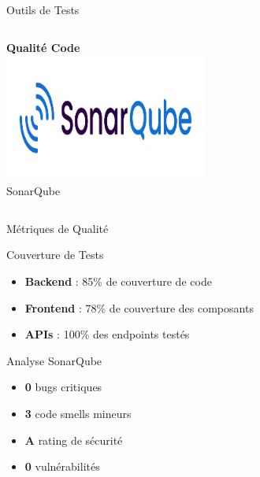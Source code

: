 \documentclass[aspectratio=169]{beamer}
\begin{document}
\begin{frame}{Outils de Tests}
\begin{columns}
        \begin{center}
            \textbf{Qualité Code}\\[0.5cm]
            \includegraphics[width=0.8\textwidth]{latex_media/media/sonarqube.png}\\
            \small SonarQube
        \end{center}
    \end{columns}
\end{frame}

\begin{frame}{Métriques de Qualité}
    \begin{block}{Couverture de Tests}
        \begin{itemize}
            \item \textbf{Backend} : 85\% de couverture de code
            \item \textbf{Frontend} : 78\% de couverture des composants
            \item \textbf{APIs} : 100\% des endpoints testés
        \end{itemize}
    \end{block}

    \begin{block}{Analyse SonarQube}
        \begin{itemize}
            \item \textcolor{greencap}{\textbf{0}} bugs critiques
            \item \textcolor{orangecap}{\textbf{3}} code smells mineurs
            \item \textcolor{greencap}{\textbf{A}} rating de sécurité
            \item \textcolor{greencap}{\textbf{0}} vulnérabilités
        \end{itemize}
    \end{block}
\end{frame}
\end{document}
